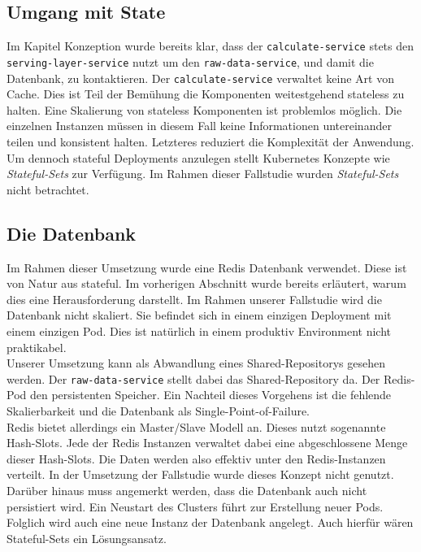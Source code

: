 \subsection{Umgang mit State}
Im Kapitel Konzeption wurde bereits klar, dass der \lstinline{calculate-service} stets den \lstinline{serving-layer-service} nutzt um den \lstinline{raw-data-service}, und damit die Datenbank, zu kontaktieren. Der \lstinline{calculate-service} verwaltet keine Art von Cache. Dies ist Teil der Bemühung die Komponenten weitestgehend stateless zu halten. Eine Skalierung von stateless Komponenten ist problemlos möglich. Die einzelnen Instanzen müssen in diesem Fall keine Informationen untereinander teilen und  konsistent halten. Letzteres reduziert die Komplexität der Anwendung. Um dennoch stateful Deployments anzulegen stellt Kubernetes Konzepte wie \textit{Stateful-Sets} \cite{noauthor_statefulsets_nodate} zur Verfügung. Im Rahmen dieser Fallstudie wurden\textit{ Stateful-Sets} nicht betrachtet. 
\subsection{Die Datenbank}
Im Rahmen dieser Umsetzung wurde eine Redis Datenbank verwendet. Diese ist von Natur aus stateful. Im vorherigen Abschnitt wurde bereits erläutert, warum dies eine Herausforderung darstellt. Im Rahmen unserer Fallstudie wird die Datenbank nicht skaliert. Sie befindet sich in einem einzigen Deployment mit einem einzigen Pod. Dies ist natürlich in einem produktiv Environment nicht praktikabel. \\
Unserer Umsetzung kann als Abwandlung eines Shared-Repositorys gesehen werden. Der \lstinline{raw-data-service} stellt dabei das Shared-Repository da. Der Redis-Pod den persistenten Speicher. Ein Nachteil dieses Vorgehens ist die fehlende Skalierbarkeit und die Datenbank als Single-Point-of-Failure.\\
Redis bietet allerdings ein Master/Slave Modell an. Dieses nutzt sogenannte Hash-Slots. Jede der Redis Instanzen verwaltet dabei eine abgeschlossene Menge dieser Hash-Slots. Die Daten werden also effektiv unter den Redis-Instanzen verteilt. In der Umsetzung der Fallstudie wurde dieses Konzept nicht genutzt. \cite{noauthor_redis_nodate} \\
Darüber hinaus muss angemerkt werden, dass die Datenbank auch nicht persistiert wird. Ein Neustart des Clusters führt zur Erstellung neuer Pods. Folglich wird auch eine neue Instanz der Datenbank angelegt. Auch hierfür wären Stateful-Sets \cite{noauthor_statefulsets_nodate} ein Lösungsansatz. 
